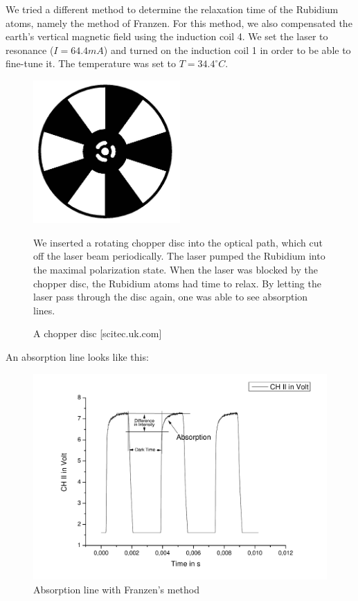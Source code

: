 We tried a different method to determine the relaxation time of the Rubidium atoms, namely the method of Franzen. For this method, we also compensated the earth's vertical magnetic field using the induction coil 4. We set the laser to resonance ($I=64.4 mA$) and turned on the induction coil 1 in order to be able to fine-tune it. The temperature was set to $T=34.4^\circ C$.\\

\begin{figure}[H]
\begin{minipage}{0.5\textwidth}
\centering \includegraphics[width=0.5\textwidth]{BilderAusw/chopper.png}
\caption{A chopper disc [scitec.uk.com]}
\end{minipage}
\begin{minipage}{0.5\textwidth}
We inserted a rotating chopper disc into the optical path, which cut off the laser beam periodically. The laser pumped the Rubidium into the maximal polarization state. When the laser was blocked by the chopper disc, the Rubidium atoms had time to relax. By letting the laser pass through the disc again, one was able to see absorption lines.\\

\end{minipage}
\end{figure}

An absorption line looks like this:

\begin{figure}[H]
\centering \includegraphics[width=\textwidth]{BilderAusw/FranzenBsp.pdf}
\caption{Absorption line with Franzen's method}
\end{figure}





















